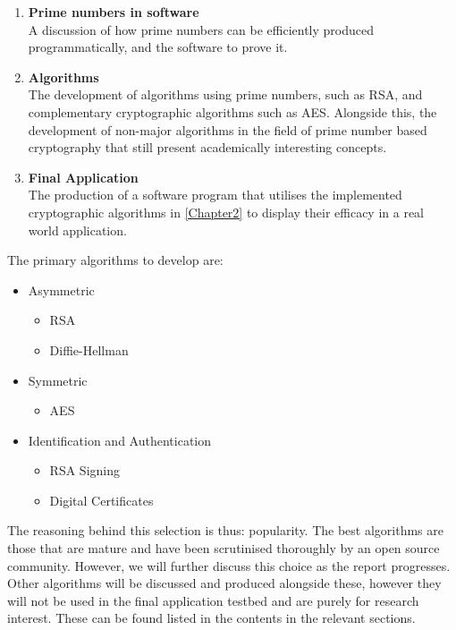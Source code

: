 \begin{enumerate}
	\item \textbf{Prime numbers in software} \\
		A discussion of how prime numbers can be efficiently produced programmatically, and the software to prove it.
	\item \textbf{Algorithms} \\
		The development of algorithms using prime numbers, such as RSA, and complementary cryptographic algorithms such as AES. Alongside this, the development of non-major algorithms in the field of prime number based cryptography that still present academically interesting concepts.
	\item \textbf{Final Application} \\
		The production of a software program that utilises the implemented cryptographic algorithms in \textsection\ref{Chapter2} to display their efficacy in a real world application.
\end{enumerate}

The primary algorithms to develop are:

\begin{itemize}
	\item Asymmetric
		\begin{itemize}
			\item RSA
			\item Diffie-Hellman
		\end{itemize}
	\item Symmetric
		\begin{itemize}
			\item AES
		\end{itemize}
	\item Identification and Authentication
		\begin{itemize}
			\item RSA Signing
			\item Digital Certificates
		\end{itemize}
\end{itemize}

The reasoning behind this selection is thus: popularity. The best algorithms are those that are mature and have been scrutinised thoroughly by an open source community. However, we will further discuss this choice as the report progresses. Other algorithms will be discussed and produced alongside these, however they will not be used in the final application testbed and are purely for research interest. These can be found listed in the contents in the relevant sections.
		
